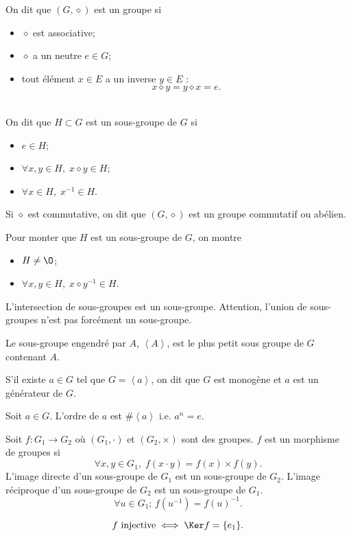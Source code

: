 \begin{multicols}{2}
	\begin{recap-box}[frametitle={Groupe}]
		On dit que $(G, \diamond)$ est un groupe si
		\begin{itemize}
			\item $\diamond$ est associative;
			\item $\diamond$ a un neutre $e \in G$;
			\item tout élément $x \in E$ a un inverse $y \in E$ :  \[
					x\diamond y = y \diamond x = e
				.\]
		\end{itemize}
		~\\[-5mm]
		On dit que $H \subset G$ est un sous-groupe de $G$ si
		\begin{itemize}
			\item $e \in H$;
			\item $\forall x,y \in H,\;x\diamond y \in H$;
			\item $\forall x \in H,\;x^{-1} \in H$.
		\end{itemize}
	\end{recap-box}
	\begin{recap-box}
		Si $\diamond$ est commutative, on dit que $(G, \diamond)$ est un groupe commutatif ou abélien.
	\end{recap-box}
	\begin{recap-box}
		Pour monter que $H$ est un sous-groupe de $G$, on montre
		\begin{itemize}
			\item $H \neq \O$;
			\item $\forall x,y \in H,\;x \diamond y^{-1} \in H$.
		\end{itemize}
	\end{recap-box}
	\begin{recap-box}
		L'intersection de sous-groupes est un sous-groupe. Attention, l'union de sous-groupes n'est pas forcément un sous-groupe.
	\end{recap-box}
	\begin{recap-box}[frametitle={Sous-groupe engendré}]
		Le sous-groupe engendré par $A$, $\left<A \right>$, est le plus petit sous groupe de $G$ contenant $A$.

		S'il existe $a \in G$ tel que $G = \left<a \right>$, on dit que $G$ est monogène et $a$ est un générateur de $G$.

		Soit $a \in G$. L'ordre de $a$ est $\#\left<a \right>$ i.e. $a^n=e$.
	\end{recap-box}
	\begin{recap-box}[frametitle={Morphisme de groupes}]
		Soit $f : G_1 \to G_2$ où $(G_1, \cdot)$ et $(G_2, \times )$ sont des groupes. $f$ est un morphisme de groupes si \[
			\forall x,y \in G_1,\;f(x \cdot y) = f(x) \times f(y)
		.\] L'image directe d'un sous-groupe de $G_1$ est un sous-groupe de $G_2$.
			L'image réciproque d'un sous-groupe de $G_2$ est un sous-groupe de $G_1$. \[
				\forall  u\in G_1;\,f\left( u^{-1} \right) = f(u)^{-1}
			.\]
	\end{recap-box}
	\begin{recap-box}
		\[
			f \text{ injective} \iff \Ker f = \{e_1\}
		.\]
	\end{recap-box}
\end{multicols}
